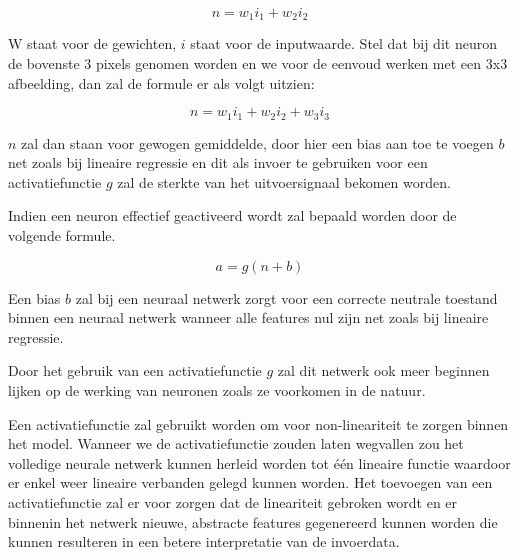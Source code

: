 \begin{equation}
n=w_1 i_1+w_2 i_2
\end{equation}

W staat voor de gewichten, $i$ staat voor de inputwaarde. Stel dat bij dit neuron de bovenste 3 pixels genomen worden en we voor de eenvoud werken met een 3x3 afbeelding, dan zal de formule er als volgt uitzien:

\begin{equation}
n=w_1 i_1+w_2 i_2+ w_3 i_3
\end{equation}

$n$ zal dan staan voor gewogen gemiddelde, door hier een bias aan toe te voegen $b$ net zoals bij lineaire regressie en dit als invoer te gebruiken voor een activatiefunctie $g$ zal de sterkte van het uitvoersignaal bekomen worden. 


Indien een neuron effectief geactiveerd wordt zal bepaald worden door de volgende formule.

\begin{equation}
a = g(n + b)
\end{equation}

Een bias $b$ zal bij een neuraal netwerk zorgt voor een correcte neutrale toestand binnen een neuraal netwerk wanneer alle features nul zijn net zoals bij lineaire regressie.  

Door het gebruik van een activatiefunctie $g$ zal dit netwerk ook meer beginnen lijken op de werking van neuronen zoals ze voorkomen in de natuur. 

Een activatiefunctie zal gebruikt worden om voor non-lineariteit te zorgen binnen het model. Wanneer we de activatiefunctie zouden laten wegvallen zou het volledige neurale netwerk kunnen herleid worden tot \'{e}\'{e}n lineaire functie waardoor er enkel weer lineaire verbanden gelegd kunnen worden. Het toevoegen van een activatiefunctie zal er voor zorgen dat de lineariteit gebroken wordt en er binnenin het netwerk nieuwe, abstracte features gegenereerd kunnen worden die kunnen resulteren in een betere interpretatie van de invoerdata.



